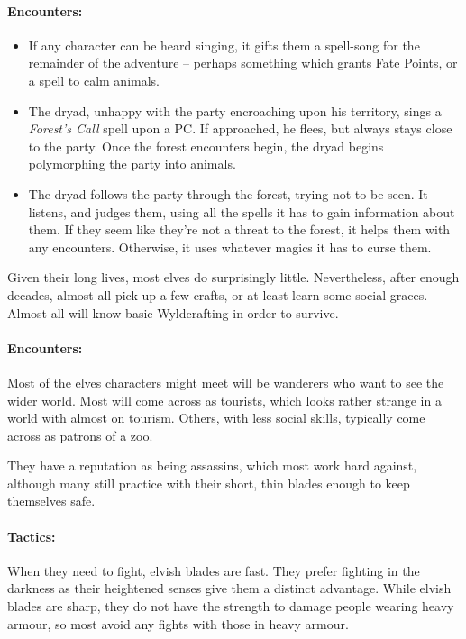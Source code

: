 \begin{multicols}{2}
\paragraph{Encounters:}

\begin{itemize}

  \item
  If any character can be heard singing, it gifts them a spell-song for the remainder of the adventure -- perhaps something which grants Fate Points, or a spell to calm animals.
  \item
  The dryad, unhappy with the party encroaching upon his territory, sings a \textit{Forest's Call} spell upon a PC.%
  \iftoggle{core}{
  \footnote{\nameref{forestsCall}.  Core rules, page \pageref{forestsCall}.}%
  }{}
  If approached, he flees, but always stays close to the party.
  Once the forest encounters begin, the dryad begins polymorphing the party into animals.
  \item
  The dryad follows the party through the forest, trying not to be seen.
  It listens, and judges them, using all the spells it has to gain information about them.
  If they seem like they're not a threat to the forest, it helps them with any encounters.
  Otherwise, it uses whatever magics it has to curse them.

\end{itemize}

\label{elf}

Given their long lives, most elves do surprisingly little.
Nevertheless, after enough decades, almost all pick up a few crafts, or at least learn some social graces.
Almost all will know basic Wyldcrafting in order to survive.

\paragraph{Encounters:}
Most of the elves characters might meet will be wanderers who want to see the wider world.
Most will come across as tourists, which looks rather strange in a world with almost on tourism.
Others, with less social skills, typically come across as patrons of a zoo.

They have a reputation as being assassins, which most work hard against, although many still practice with their short, thin blades enough to keep themselves safe.

\paragraph{Tactics:} When they need to fight, elvish blades are fast.
They prefer fighting in the darkness as their heightened senses give them a distinct advantage.
While elvish blades are sharp, they do not have the strength to damage people wearing heavy armour, so most avoid any fights with those in heavy armour.


\end{multicols}
